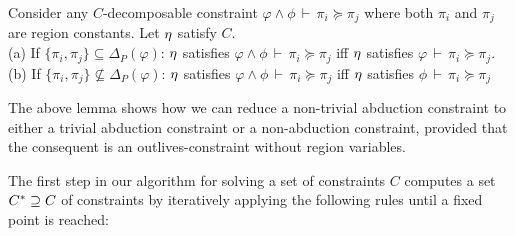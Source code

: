 \documentclass[a4paper,UKenglish]{lipics-v2018}
\newcommand{\conj}{\wedge}
\newcommand{\isvalid}[2]{#1\,\vdash\,#2}
\newcommand{\outlives}{\succeq}
\newcommand{\predDeltaMap}{{\Delta_P}}
\begin{document}
\begin{lemma}
\label{lemma:decomposition}
  Consider any $C$-decomposable constraint $\isvalid{\varphi \conj \phi}{\pi_i \outlives \pi_j}$
  where both $\pi_i$ and $\pi_j$ are region constants.
  Let $\eta$ satisfy $C$.\\
  (a) If $\{ \pi_i, \pi_j \} \subseteq \predDeltaMap(\varphi)$:
  $\eta$ satisfies $\isvalid{\varphi \conj \phi}{\pi_i \outlives \pi_j}$
  iff
  $\eta$ satisfies $\isvalid{\varphi}{\pi_i \outlives \pi_j}$.\\
  (b) If $\{ \pi_i, \pi_j \} \not \subseteq \predDeltaMap(\varphi)$:
  $\eta$ satisfies $\isvalid{\varphi \conj \phi}{\pi_i \outlives \pi_j}$
  iff
  $\eta$ satisfies $\isvalid{\phi}{\pi_i \outlives \pi_j}$
\end{lemma}

The above lemma shows how we can reduce a non-trivial abduction constraint to
either a trivial abduction constraint or a non-abduction constraint,
provided that the consequent is an outlives-constraint without region variables.

The first step in our algorithm for solving a set of constraints $C$
computes a set ${C}^* \supseteq C$ of constraints by iteratively applying
the following rules until a fixed point is reached:
\end{document}
